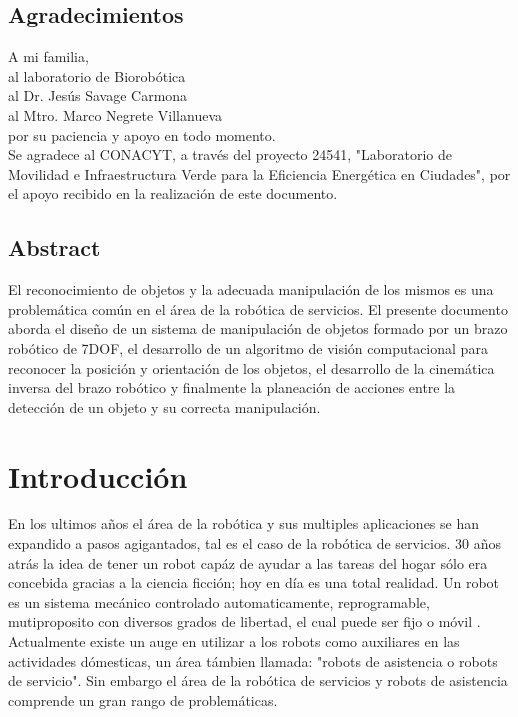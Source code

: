 \documentclass[a4paper, openright, 12pt]{report}
\begin{document}
\newpage{}
	\section*{Agradecimientos}

	A mi familia,\\
	al laboratorio de Biorobótica\\
	al Dr. Jesús Savage Carmona\\
	al Mtro. Marco Negrete Villanueva\\
	por su paciencia y apoyo en todo momento.\\



	Se agradece al CONACYT, a través del proyecto 24541, "Laboratorio de Movilidad e Infraestructura Verde para la Eficiencia Energética en Ciudades", por el apoyo recibido en la realización de este documento.



\newpage{}
\section*{Abstract}
	El reconocimiento de objetos y la adecuada manipulación de los mismos es una problemática común en el área de la robótica de servicios. El presente documento aborda el diseño de un sistema de manipulación de objetos formado por un brazo robótico de 7DOF, el desarrollo de un algoritmo de visión computacional para reconocer la posición y orientación de los objetos, el desarrollo de la cinemática inversa del brazo robótico y finalmente la planeación de acciones entre la detección de un objeto y su correcta manipulación.




\chapter{Introducción}
	En los ultimos años el área de la robótica y sus multiples aplicaciones se han expandido a pasos agigantados, tal es el caso de la robótica de servicios. 30 años atrás la idea de tener un robot capáz de ayudar a las tareas del hogar sólo era concebida gracias a la ciencia ficción; hoy en día es una total realidad. Un robot es un sistema mecánico controlado automaticamente, reprogramable, mutiproposito con diversos grados de libertad, el cual puede ser fijo o móvil \cite{khalil2004}. Actualmente existe un auge en utilizar a los robots como auxiliares en las actividades dómesticas, un área támbien llamada: "robots de asistencia o robots de servicio". Sin embargo el área de la robótica de servicios y robots de asistencia comprende un gran rango de problemáticas.\\
\end{document}
